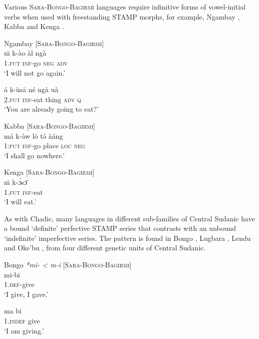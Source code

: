 \documentclass[output=paper]{langsci/langscibook}
\begin{document}
Various \textsc{Sara-Bongo-Bagirmi} languages require infinitive forms of vowel-initial verbs when used with freestanding STAMP morphs, for example, Ngambay , Kabba  and Kenga .

\ea\label{ex:anderson:48}
Ngambay \citep[118]{Vandame1963}      [\textsc{Sara-Bongo-Bagirmi}]\\
\ea\label{ex:anderson:48a}
\={m}    k-ào   àl   ngà\\
   1.\textsc{fut}   \textsc{inf}-go  \textsc{neg}   \textsc{adv}\\
\glt `I will not go again.'

\ex \label{ex:anderson:48b}
\gll á   k-ùs\={a}    né   ngà   uà\\
 2.\textsc{fut}   \textsc{inf}-eat thing   \textsc{adv}   \textsc{q}\\
\glt `You are already going to eat?'
\z
\z

\ea\label{ex:anderson:49}
Kabba  \citep[220]{Moser2004}         [\textsc{Sara-Bongo-Bagirmi}]\\
\gll má  k-àw  lò  t\'{ə}  àáng    \\
1:\textsc{fut}  \textsc{inf}-go  place  \textsc{loc}  \textsc{neg}    \\
\glt `I shall go nowhere.'
\z

\ea\label{ex:anderson:50}
Kenga  \citep[15]{Neukom2010}        [\textsc{Sara-Bongo-Bagirmi}]\\
\gll \={m}    k-\`{ɔ}s\={ɔ}\\
1.\textsc{fut}  \textsc{inf}-eat\\
\glt `I will eat.'
\z

As with Chadic, many languages in different sub-families of Central Sudanic have a bound `definite' perfective STAMP series that contrasts with an unbound `indefinite' imperfective series. The pattern is found in Bongo , Lugbara , Lendu  and Oke'bu , from four different genetic units of Central Sudanic. 

\ea\label{ex:anderson:51}
Bongo   \textit{*mi- < m-i} \citep[75]{TuckerBryan1966}    [\textsc{Sara-Bongo-Bagirmi}]\\
\ea\label{ex:anderson:51a}
\gll mi-bi\\
1.\textsc{def}-give\\
\glt `I give, I gave.'

\ex \label{ex:anderson:51b}
\gll ma    bi\\
 1.\textsc{indef}  give\\
\glt  `I am giving.'    
\z
\z
\end{document}
